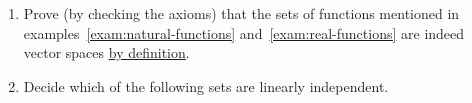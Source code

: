 \begin{enumerate}
 \item 
 Prove (by checking the axioms) that the sets of functions mentioned in
 examples~\ref{exam:natural-functions} and~\ref{exam:real-functions} are indeed
 vector spaces  \hyperref[def:abstract-vector-space]{by definition}.
\item 
 Decide which of the following sets are linearly independent.
\end{enumerate}
